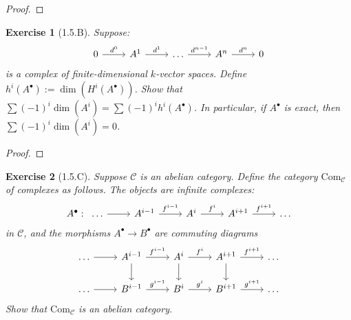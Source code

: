 \documentclass{amsart}
\newtheorem*{exercise*}{Exercise}
\begin{document}
\vspace{0.1in}

\begin{proof}
	
\end{proof}

\vspace{0.1in}


\begin{exercise*}[1.5.B]
    Suppose:
    \begin{equation*}
        \begin{tikzcd}
            0 \arrow[r, "d^0"] & A^1 \arrow[r, "d^1"] & \ldots \arrow[r, "d^{n-1}"] & A^n \arrow[r, "d^n"] & 0  
        \end{tikzcd}
    \end{equation*}
    is a complex of finite-dimensional $k$-vector spaces. Define $h^i(A^\bullet):= \dim(H^i(A^\bullet))$. Show that $\sum(-1)^i\dim(A^i)=\sum(-1)^ih^i(A^\bullet)$. In particular, if $A^\bullet$ is exact, then $\sum(-1)^i\dim(A^i)=0$. 
\end{exercise*}

\vspace{0.1in}

\begin{proof}
	
\end{proof}

\vspace{0.1in}


\begin{exercise*}[1.5.C]
    Suppose $\mathscr{C}$ is an abelian category. Define the category $\mathrm{Com}_{\mathscr{C}}$ of complexes as follows. The objects are infinite complexes:
    \begin{equation*}
        \begin{tikzcd}
            A^\bullet:\;\; \ldots \arrow[r] & A^{i-1} \arrow[r, "f^{i-1}"] & A^i \arrow[r, "f^i"] & A^{i+1} \arrow[r, "f^{i+1}"] & \ldots
        \end{tikzcd}
    \end{equation*}
    in $\mathscr{C}$, and the morphisms $A^\bullet \rightarrow B^\bullet$ are commuting diagrams
    \begin{equation*}
        \begin{tikzcd}
            \ldots \arrow[r] & A^{i-1} \arrow[r, "f^{i-1}"] \arrow[d] & A^i \arrow[r, "f^i"] \arrow[d] & A^{i+1} \arrow[r, "f^{i+1}"] \arrow[d] & \ldots \\
            \ldots \arrow[r] & B^{i-1} \arrow[r, "g^{i-1}"] & B^{i} \arrow[r, "g^i"] & B^{i+1} \arrow[r, "g^{i+1}"] & \ldots
        \end{tikzcd}
    \end{equation*}
    Show that $\mathrm{Com}_{\mathscr{C}}$ is an abelian category. 
\end{exercise*}
\end{document}
